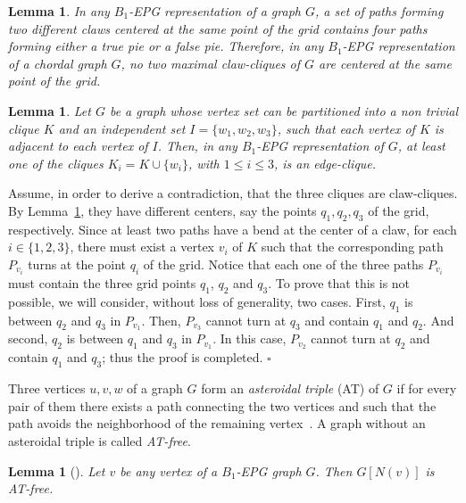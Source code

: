 \documentclass[9pt]{entcs}
\newtheorem{lema}[thm]{Lemma}%
\begin{document}
\begin{lema}\label{lem:twoClawNotSameCenterInChordal}
In any $B_1$-EPG representation of a graph $G$, a set of paths forming two different claws centered at the same point of the grid contains four paths forming either a true pie or a false pie. Therefore, in any $B_1$-EPG representation of a chordal graph $G$, no two maximal claw-cliques of $G$ are centered at the same point of the grid.
\end{lema}

\begin{lema}\label{lem:3cliquesNotClaw}
Let $G$ be a graph whose vertex set  can be
partitioned into a non trivial clique $K$ and an independent set $I=\{w_1,w_2,w_3\}$, such that each vertex of $K$ is adjacent to each vertex of $I$. Then, in any $B_1$-EPG representation of $G$, at least one of the cliques  $K_i = K \cup \{w_i\}$, with $1 \leq i \leq 3$,  is an edge-clique. 
\end{lema}

\begin{pf}
Assume, in order to derive a contradiction, that the three cliques are claw-cliques. By Lemma~\ref{lem:twoClawNotSameCenterInChordal}, they have different centers, say the points $q_1, q_2, q_3$ of the grid, respectively. Since at least two paths have a bend at the center of a claw, for each $i\in\{1,2,3\}$,   there must exist a vertex
  $v_i$ of $K$ such that the corresponding path $P_{v_i}$ turns at the point $q_i$ of the grid.  Notice that each one of the three paths $P_{v_i}$
  must contain  the three grid points $q_1$, $q_2$ and $q_3$. To prove that this is not possible, we will consider, without loss of generality, two cases.
  First,  $q_1$ is between $q_2$ and $q_3$ in $P_{v_1}$. Then, $P_{v_3}$ cannot turn at $q_3$ and contain $q_1$ and $q_2$.   And second,
  $q_2$ is between $q_1$ and $q_3$ in $P_{v_1}$. In this case, $P_{v_2}$ cannot turn at $q_2$ and contain $q_1$ and $q_3$; thus the proof is completed.
 $\square$
\end{pf}

Three vertices $u, v, w$ of a graph $G$ form an \textit{asteroidal triple} (AT) of $G$ if for every pair of them there exists a path connecting the two vertices and such that the path avoids the neighborhood of the remaining vertex~\cite{Asinowski2009}. A graph without an asteroidal triple is called \textit{AT-free}. 

\begin{lema}
[\cite{ries2009}] \label{l:AT-free} Let $v$ be any vertex of a $B_1$-EPG graph $G$. Then $G[N(v)]$ is AT-free.
\end{lema}
\end{document}
